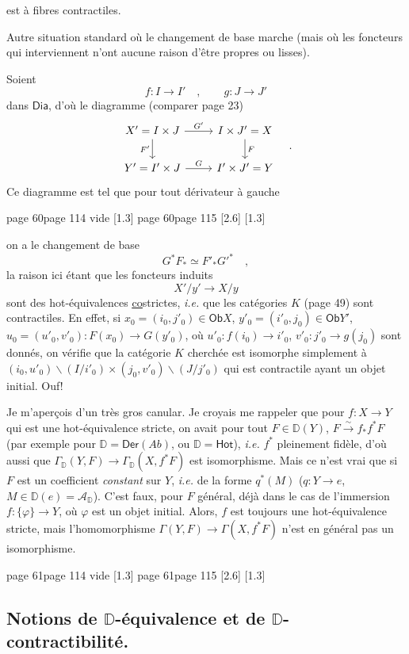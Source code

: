 \documentclass[11pt,leqno]{article}
\newcommand{\printedpage}[1]{\marginnote{\scriptsize\sffamily ed.\ #1}}
\newcommand{\msp}[1]{%
  \begingroup\def\thismsp{#1}\def\blankmsp{page 114 vide}%
  \ifx\thismsp\blankmsp
    \marginnote{\scriptsize\sffamily [114: vide]}[1.3\baselineskip]%
  \else\def\followingmsp{page 115}%
    \ifx\thismsp\followingmsp
      \marginnote{\scriptsize\sffamily [page 115]}[2.6\baselineskip]%
    \else\marginnote{\scriptsize\sffamily [#1]}[1.3\baselineskip]\fi
  \fi\endgroup}
\newcommand{\DD}{\ensuremath{\mathbb{D}}}
\newcommand{\cA}{\ensuremath{\mathcal{A}}}
\newcommand{\Dia}{\ensuremath{\mathsf{Dia}}}
\newcommand{\Ob}{\ensuremath{\mathsf{Ob}}}
\newcommand{\Hot}{\ensuremath{\mathsf{Hot}}}
\newcommand{\isoto}{\overset{\sim}{\to}}
\begin{document}
\printedpage{34}
\noindent est à fibres contractiles.

Autre situation standard où le changement de base marche (mais où les foncteurs qui interviennent n'ont aucune raison d'être propres ou lisses).

Soient
\[
f : I \longrightarrow I' \quad , \qquad g : J \longrightarrow J'
\]
dans $\Dia$, d'où le diagramme (comparer page 23)
\[
\begin{tikzcd}
X' = I \times J \arrow[r, "G'"] \arrow[d, "F'"'] & I \times J' = X \arrow[d, "F"] \\
Y' = I' \times J \arrow[r, "G"] & I' \times J' = Y
\end{tikzcd}
\quad .
\]
Ce diagramme est tel que pour tout dérivateur à gauche

\noindent\msp{page 60}

\noindent on a le changement de base
\[
G^*F_* \simeq F'_*{G'}^* \quad ,
\]
la raison ici étant que les foncteurs induits
\[
X'/y' \longrightarrow X/y
\]
sont des hot-équivalences \underline{\underline{co}}strictes, \textit{i.e.} que les catégories $K$ (page 49) sont contractiles. En effet, si $x_0 = (i_0, j'_0) \in \Ob X$, $y'_0 = (i'_0, j_0) \in \Ob Y'$, $u_0 = (u'_0, v'_0) : F(x_0) \to G(y'_0)$, où $u'_0 : f(i_0) \to i'_0$, $v'_0 : j'_0 \to g(j_0)$ sont donnés, on vérifie que la catégorie $K$ cherchée est isomorphe simplement à $(i_0, u'_0)\backslash(I/i'_0) \times (j_0, v'_0)\backslash(J/j'_0)$ qui est contractile ayant un objet initial. Ouf!

Je m'aperçois d'un très gros canular. Je croyais me rappeler que pour $f : X \to Y$ qui est une hot-équivalence stricte, on avait pour tout $F \in \DD(Y)$, $F \isoto f_*f^*F$ (par exemple pour $\DD = \mathsf{Der}(\mathit{Ab})$, ou $\DD = \Hot$), \textit{i.e.} $f^*$ pleinement fidèle, d'où aussi que $\Gamma_{\DD}(Y, F) \to \Gamma_{\DD}(X, f^*F)$ est isomorphisme. Mais ce n'est vrai que si $F$ est un coefficient \textit{constant} sur $Y$, \textit{i.e.} de la forme $q^*(M)$ ($q : Y \to e$, $M \in \DD(e) = \cA_{\DD}$). C'est faux, pour $F$ général, déjà dans le cas de l'immersion $f : \{\varphi\} \to Y$, où $\varphi$ est un objet initial. Alors, $f$ est toujours une hot-équivalence stricte, mais l'homomorphisme $\Gamma(Y, F) \to \Gamma(X, f^*F)$ n'est en général pas un isomorphisme.

\clearpage
\printedpage{35}
\noindent\msp{page 61}

\subsection*{Notions de $\mathbb{D}$-équivalence et de $\mathbb{D}$-contractibilité.}
\end{document}
